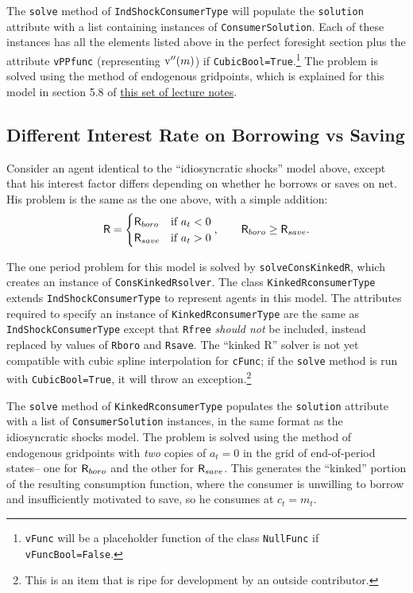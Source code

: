\documentclass[12pt,titlepage,letterpaper]{econtex}
\begin{document}
The \texttt{solve} method of \texttt{IndShockConsumerType} will populate the \texttt{solution} attribute with a list containing instances of \texttt{ConsumerSolution}.  Each of these instances has all the elements listed above in the perfect foresight section plus the attribute \texttt{vPPfunc} (representing $\mathrm{v}''(m)$) if \texttt{CubicBool=True}.\footnote{\texttt{vFunc} will be a placeholder function of the class \texttt{NullFunc} if \texttt{vFuncBool=False}.}  The problem is solved using the method of endogenous gridpoints, which is explained for this model in section 5.8 of \href{http://www.econ2.jhu.edu/people/ccarroll/SolvingMicroDSOPs/}{this set of lecture notes}.


\subsection{Different Interest Rate on Borrowing vs Saving}

Consider an agent identical to the ``idiosyncratic shocks'' model above, except that his interest factor differs depending on whether he borrows or saves on net.  His problem is the same as the one above, with a simple addition:
\begin{equation*}
\mathsf{R} = \begin{cases}
\mathsf{R}_{boro} & \text{if  } a_t < 0 \\
\mathsf{R}_{save} & \text{if  } a_t > 0
\end{cases}, \qquad \mathsf{R}_{boro} \geq \mathsf{R}_{save}.
\end{equation*}

The one period problem for this model is solved by \texttt{solveConsKinkedR}, which creates an instance of \texttt{ConsKinkedRsolver}.  The class \texttt{KinkedRconsumerType} extends \texttt{IndShockConsumerType} to represent agents in this model.  The attributes required to specify an instance of \texttt{KinkedRconsumerType} are the same as \texttt{IndShockConsumerType} except that \texttt{Rfree} \textit{should not} be included, instead replaced by values of \texttt{Rboro} and \texttt{Rsave}.  The ``kinked R'' solver is not yet compatible with cubic spline interpolation for \texttt{cFunc}; if the \texttt{solve} method is run with \texttt{CubicBool=True}, it will throw an exception.\footnote{This is an item that is ripe for development by an outside contributor.}

The \texttt{solve} method of \texttt{KinkedRconsumerType} populates the \texttt{solution} attribute with a list of \texttt{ConsumerSolution} instances, in the same format as the idiosyncratic shocks model.  The problem is solved using the method of endogenous gridpoints with \textit{two} copies of $a_t = 0$ in the grid of end-of-period states-- one for $\mathsf{R}_{boro}$ and the other for $\mathsf{R}_{save}$.  This generates the ``kinked'' portion of the resulting consumption function, where the consumer is unwilling to borrow and insufficiently motivated to save, so he consumes at $c_t = m_t$.
\end{document}
